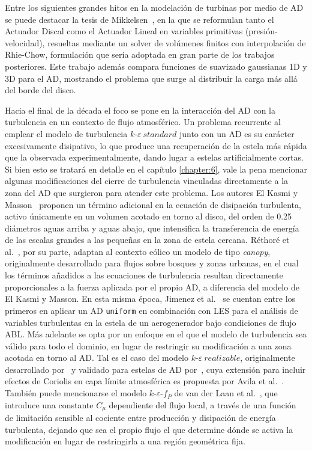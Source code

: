 Entre los siguientes grandes hitos en la modelación de turbinas por medio de AD se puede destacar la tesis de Mikkelsen~\cite{mikkelsenThesis2003}, en la que se reformulan tanto el Actuador Discal como el Actuador Lineal en variables primitivas (presión-velocidad), resueltas mediante un solver de volúmenes finitos con interpolación de Rhie-Chow, formulación que sería adoptada en gran parte de los trabajos posteriores. Este trabajo además compara funciones de suavizado gaussianas 1D y 3D para el AD, mostrando el problema que surge al distribuir la carga más allá del borde del disco.

Hacia el final de la década el foco se pone en la interacción del AD con la turbulencia en un contexto de flujo atmosférico. Un problema recurrente al emplear el modelo de turbulencia $k$-$\varepsilon \ standard$ junto con un AD es su carácter excesivamente disipativo, lo que produce una recuperación de la estela más rápida que la observada experimentalmente, dando lugar a estelas artificialmente cortas. Si bien esto se tratará en detalle en el capítulo \ref{chapter:6}, vale la pena mencionar algunas modificaciones del cierre de turbulencia vinculadas directamente a la zona del AD que surgieron para atender este problema. Los autores El Kasmi y Masson~\cite{elkasmi2008} proponen un término adicional en la ecuación de disipación turbulenta, activo únicamente en un volumen acotado en torno al disco, del orden de 0.25 diámetros aguas arriba y aguas abajo, que intensifica la transferencia de energía de las escalas grandes a las pequeñas en la zona de estela cercana. Réthoré et al.~\cite{rethore2009}, por su parte, adaptan al contexto eólico un modelo de tipo \textit{canopy}, originalmente desarrollado para flujos sobre bosques y zonas urbanas, en el cual los términos añadidos a las ecuaciones de turbulencia resultan directamente proporcionales a la fuerza aplicada por el propio AD, a diferencia del modelo de El Kasmi y Masson. En esta misma época, Jimenez et al.~\cite{jimenez2007} se cuentan entre los primeros en aplicar un AD \texttt{uniform} en combinación con LES para el análisis de variables turbulentas en la estela de un aerogenerador bajo condiciones de flujo ABL. Más adelante se opta por un enfoque en el que el modelo de turbulencia sea válido para todo el dominio, en lugar de restringir su modificación a una zona acotada en torno al AD. Tal es el caso del modelo $k$-$\varepsilon \ realizable$, originalmente desarrollado por~\cite{shih1995} y validado para estelas de AD por~\cite{cabezon2011}, cuya extensión para incluir efectos de Coriolis en capa límite atmosférica es propuesta por Avila et al.~\cite{avila2017}. También puede mencionarse el modelo $k$-$\varepsilon$-$f_P$ de van der Laan et al.~\cite{vanderlaan2015}, que introduce una constante $C_\mu$ dependiente del flujo local, a través de una función de limitación sensible al cociente entre producción y disipación de energía turbulenta, dejando que sea el propio flujo el que determine dónde se activa la modificación en lugar de restringirla a una región geométrica fija.

